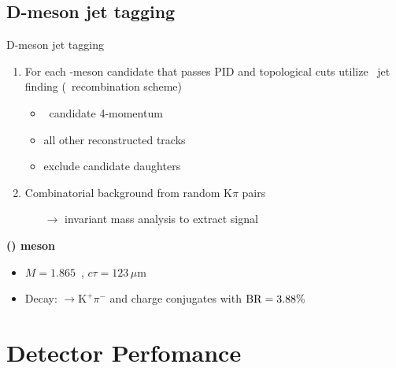 \documentclass[xcolor={usenames,dvipsnames}]{beamer}
\begin{document}
\subsection{D-meson jet tagging}
\begin{frame}{D-meson jet tagging}
\begin{enumerate}
\item For each \Dzero-meson candidate that passes \alert{PID} and \alert{topological} cuts utilize \antikt\ \alert{jet finding} (\pt\ recombination scheme)
\medskip
\begin{itemize}
\item \Dzero\ candidate 4-momentum
\smallskip
\item all other reconstructed tracks
\smallskip
\item exclude candidate daughters
\end{itemize}
\medskip
\item Combinatorial background from random $\mathrm{K}\pi$ pairs 
\medskip
\begin{itemize}
\item[$\rightarrow$] \alert{invariant mass analysis} to extract signal
\end{itemize}
\end{enumerate}
\bigskip
\textbf{\alert{\Dzero(\Dzerobar) meson}}
\begin{itemize}
\item $M=1.865$~\GeVcsq, $c\tau=123\,\mu\mathrm{m}$ 
\item Decay: \Dzero$\rightarrow\mathrm{K}^+\pi^-$ and charge conjugates with ${\rm BR}=3.88\%$
\end{itemize}
\end{frame}


\section{Detector Perfomance}
\end{document}
